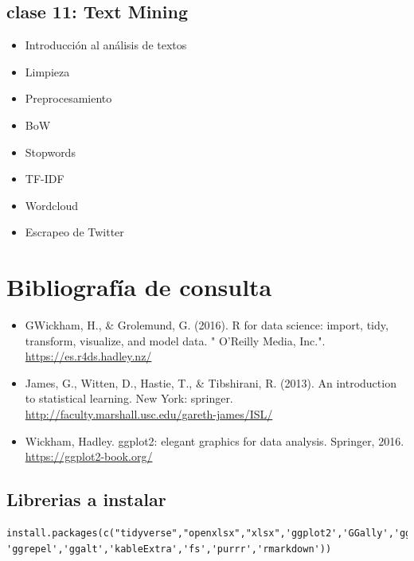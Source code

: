 \documentclass[]{book}
\providecommand{\tightlist}{%
  \setlength{\itemsep}{0pt}\setlength{\parskip}{0pt}}
\begin{document}
\hypertarget{clase-11-text-mining}{%
\subsection{\texorpdfstring{\textbf{clase 11}: Text Mining}{clase 11: Text Mining}}\label{clase-11-text-mining}}

\begin{itemize}
\tightlist
\item
  Introducción al análisis de textos
\item
  Limpieza
\item
  Preprocesamiento
\item
  BoW
\item
  Stopwords
\item
  TF-IDF
\item
  Wordcloud
\item
  Escrapeo de Twitter
\end{itemize}

\hypertarget{bibliografia-de-consulta}{%
\section{Bibliografía de consulta}\label{bibliografia-de-consulta}}

\begin{itemize}
\tightlist
\item
  GWickham, H., \& Grolemund, G. (2016). R for data science: import, tidy, transform, visualize, and model data. " O'Reilly Media, Inc.". \url{https://es.r4ds.hadley.nz/}
\item
  James, G., Witten, D., Hastie, T., \& Tibshirani, R. (2013). An introduction to statistical learning. New York: springer. \url{http://faculty.marshall.usc.edu/gareth-james/ISL/}
\item
  Wickham, Hadley. ggplot2: elegant graphics for data analysis. Springer, 2016. \url{https://ggplot2-book.org/}
\end{itemize}

\hypertarget{librerias-a-instalar}{%
\subsection{Librerias a instalar}\label{librerias-a-instalar}}

\begin{verbatim}
install.packages(c("tidyverse","openxlsx","xlsx",'ggplot2','GGally','ggridges','treemapify','esquisse','cowplot','ggthemes', 'ggrepel','ggalt','kableExtra','fs','purrr','rmarkdown'))
\end{verbatim}
\end{document}
